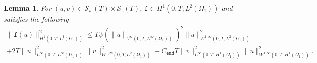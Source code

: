 \documentclass[11pt]{article}
\newtheorem{lemma}[theorem]{Lemma}
\begin{document}
\begin{lemma}\label{fh_h1}
For $(u, v)\in \mathcal{S}_w(T) \times \mathcal{S}_z(T)$, $\mathtt{f}\in H^1(0,T; L^2(\Omega_1))$ and satisfies the following 
\begin{equation}\label{est_fh}
\begin{aligned}
\parallel\mathtt{f}(u)\parallel_{ H^1(0,T; L^2(\Omega_1))}^2 \leq T \psi \left( \parallel u\parallel_{L^{\infty}(0, T; L^{\infty}(\Omega_1))} \right)^2 \parallel u\parallel_{W^{1, \infty}(0, T; L^{2}(\Omega_1))}^2 \\ + 2T\parallel u\parallel_{L^{\infty}(0,T; L^{\infty}(\Omega_1))}^2  \parallel v\parallel_{W^{1, \infty}(0,T; L^{2}(\Omega_1))}^2 + C_{\texttt{emd}}T\parallel v\parallel_{L^{\infty}(0,T; H^{1}(\Omega_1))}^2  \parallel  u\parallel_{W^{1,\infty}(0,T; H^1(\Omega_1))}^2.
\end{aligned}
\end{equation}
\end{lemma}
\end{document}
